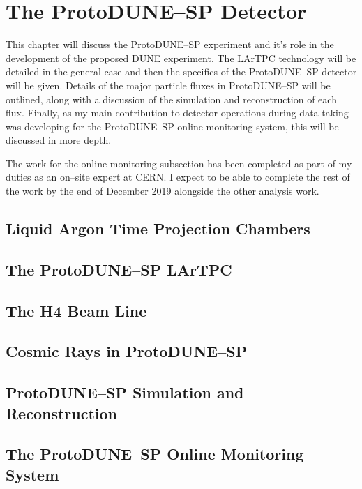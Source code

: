 \chapter{\label{ch:3-protodune}The ProtoDUNE--SP Detector} 

\minitoc

This chapter will discuss the ProtoDUNE--SP experiment and it's role in the
development of the proposed DUNE experiment. The LArTPC technology will be
detailed in the general case and then the specifics of the ProtoDUNE--SP
detector will be given. Details of the major particle fluxes in ProtoDUNE--SP
will be outlined, along with a discussion of the simulation and reconstruction
of each flux. Finally, as my main contribution to detector operations during
data taking was developing for the ProtoDUNE--SP online monitoring system, this
will be discussed in more depth. 

The work for the online monitoring subsection has been completed as part of my
duties as an on--site expert at CERN. I expect to be able to complete the rest
of the work by the end of December 2019 alongside the other analysis work.

\section{Liquid Argon Time Projection Chambers}
\section{The ProtoDUNE--SP LArTPC}
\section{The H4 Beam Line}
\section{Cosmic Rays in ProtoDUNE--SP}
\section{ProtoDUNE--SP Simulation and Reconstruction}
\section{The ProtoDUNE--SP Online Monitoring System}
